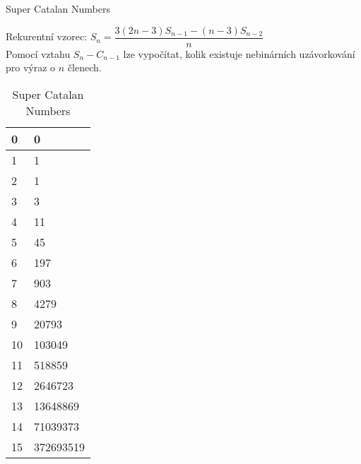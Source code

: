 \documentclass[11pt]{article}
\begin{document}
{\Large Super Catalan Numbers\par}
Rekurentní vzorec: $S_n=\dfrac{3(2n-3)S_{n-1}-(n-3)S_{n-2}}{n}$
\\Pomocí vztahu $S_n-C_{n-1}$ lze vypočítat, kolik existuje nebinárních uzávorkování pro výraz o $n$ členech.
\begin{table}[h]
\centering
\caption{Super Catalan Numbers}
\begin{tabular}{|l|l|}
\hline
0&0 \\ \hline
1&1 \\ \hline
2&1 \\ \hline
3&3 \\ \hline
4&11 \\ \hline
5&45 \\ \hline
6&197 \\ \hline
7&903 \\ \hline
8&4279 \\ \hline
9&20793 \\ \hline
10&103049 \\ \hline
11&518859 \\ \hline
12&2646723 \\ \hline
13&13648869 \\ \hline
14&71039373 \\ \hline
15&372693519 \\ \hline
\end{tabular}
\end{table}
\end{document}
